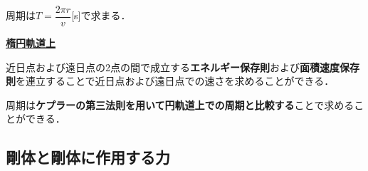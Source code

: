  周期は$T=\dfrac{2\pi r}{v}$[s]で求まる．
 
\underline{{\bf 楕円軌道上}}
 
 近日点および遠日点の2点の間で成立する{\bf エネルギー保存則}および{\bf 面積速度保存則}を連立することで近日点および遠日点での速さを求めることができる．
 
 周期は{\bf ケプラーの第三法則を用いて円軌道上での周期と比較する}ことで求めることができる．
 
% 
%

 \newpage 
 
 
\subsection{剛体と剛体に作用する力}

